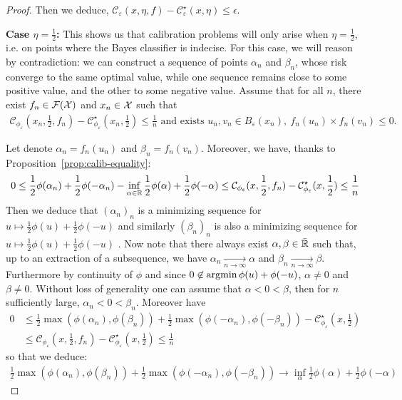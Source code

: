 \begin{proof}
    
    Then we deduce, $\mathcal{C}_{\varepsilon}(x,\eta,f) - \mathcal{C}_{\varepsilon}^\star(x,\eta)\leq \epsilon$.
    
    \medskip
    
    \textbf{Case $\eta=\frac12$:} This shows us that calibration problems will only arise when $\eta = \frac{1}{2}$, i.e. on points where the Bayes classifier is indecise. For this case, we will reason by contradiction: we can construct a sequence of points $\alpha_n$ and $\beta_n$, whose risk converge to the same optimal value, while one sequence remains close to some positive value, and the other to some negative value. Assume that for all $n$, there exist $f_n\in\mathcal{F}(\mathcal{X})$ and $x_n\in\mathcal{X}$ such that 
    \begin{align*}
        \mathcal{C}_{\phi_\varepsilon}(x_n,\frac12,f_n) - \mathcal{C}_{\phi_\varepsilon}^\star(x_n,\frac12)\leq \frac1n\text{ and exists $u_n,v_n\in B_\varepsilon(x_n)$},~ f_n(u_n)\times f_n(v_n)\leq 0.
    \end{align*}
    
    Let denote $\alpha_n = f_n(u_n)$ and $\beta_n = f_n(v_n)$. %
    Moreover, we have, thanks to Proposition~\ref{prop:calib-equality}:
    \begin{align*}
      0\leq \frac12 \phi(\alpha_n) +  \frac12 \phi(-\alpha_n)- \inf_{\alpha\in\mathbb{R}}\frac12 \phi(\alpha)+\frac12\phi(-\alpha)\leq \mathcal{C}_{\phi_\varepsilon}(x,\frac12,f_n) - \mathcal{C}_{\phi_\varepsilon}^\star(x,\frac12)\leq \frac1n
    \end{align*}
    Then we deduce that $(\alpha_n)_n$ is a minimizing sequence for  $u\mapsto\frac12\phi(u)+\frac12\phi(-u)$ and similarly $(\beta_n)_n$ is also a minimizing sequence for  $u\mapsto\frac12\phi(u)+\frac12\phi(-u)$ . Now note that there always exist $\alpha, \beta\in \bar{\mathbb{R}}$ such that, up to an extraction of a subsequence, we have $\alpha_n\xrightarrow[n\to\infty]{} \alpha$ and $\beta_n \xrightarrow[n\to\infty]{} \beta$. Furthermore by continuity of $\phi$ and since $0\not\in\operatorname*{argmin}\phi(u)+\phi(-u)$, $\alpha\neq0$ and $\beta\neq 0$. Without loss of generality one can assume that $\alpha<0<\beta$, then for $n$ sufficiently large, $\alpha_n<0<\beta_n$. Moreover have 
    \begin{align*}
         0&\leq\frac12\max\left(\phi(\alpha_n),\phi(\beta_n)\right)+\frac12\max\left(\phi(-\alpha_n),\phi(-\beta_n)\right)- \mathcal{C}^\star_{\phi_\varepsilon}(x,\frac12)\\
         &\leq \mathcal{C}_{\phi_\varepsilon}(x,\frac12,f_n) - \mathcal{C}_{\phi_\varepsilon}^\star(x,\frac12)\leq \frac1n
    \end{align*}
    so that we deduce:
    \begin{align}
    \label{eq:limitalphabeta}
     \frac12\max\left(\phi(\alpha_n),\phi(\beta_n)\right)+\frac12\max\left(\phi(-\alpha_n),\phi(-\beta_n)\right)\longrightarrow \inf_\alpha \frac12\phi(\alpha)+\frac12\phi(-\alpha) 
    \end{align}
    

\end{proof}
